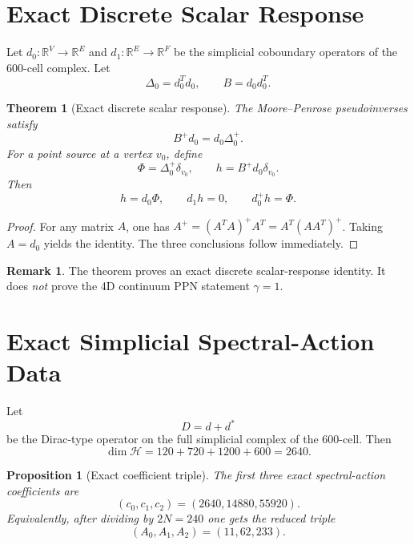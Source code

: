 \documentclass[12pt,a4paper]{article}
\newtheorem{theorem}{Theorem}
\newtheorem{proposition}{Proposition}
\theoremstyle{definition}
\newtheorem{remark}{Remark}
\begin{document}
\section{Exact Discrete Scalar Response}

Let $d_0:\mathbb{R}^V\to \mathbb{R}^E$ and $d_1:\mathbb{R}^E\to \mathbb{R}^F$ be the simplicial coboundary operators of the 600-cell complex.  Let
\begin{equation}
\Delta_0=d_0^T d_0,
\qquad
B=d_0 d_0^T.
\end{equation}

\begin{theorem}[Exact discrete scalar response]
\label{thm:scalar_response_exact}
The Moore--Penrose pseudoinverses satisfy
\begin{equation}
B^+ d_0 = d_0 \Delta_0^+.
\end{equation}
For a point source at a vertex $v_0$, define
\begin{equation}
\Phi=\Delta_0^+\delta_{v_0},
\qquad
h=B^+d_0\delta_{v_0}.
\end{equation}
Then
\begin{equation}
h=d_0\Phi,\qquad d_1 h=0,\qquad d_0^+h=\Phi.
\end{equation}
\end{theorem}

\begin{proof}
For any matrix $A$, one has $A^+=(A^T A)^+A^T=A^T(AA^T)^+$.  Taking $A=d_0$ yields the identity.  The three conclusions follow immediately.
\end{proof}

\begin{remark}
The theorem proves an exact discrete scalar-response identity.  It does \emph{not} prove the 4D continuum PPN statement $\gamma=1$.
\end{remark}

\section{Exact Simplicial Spectral-Action Data}

Let
\begin{equation}
D=d+d^*
\end{equation}
be the Dirac-type operator on the full simplicial complex of the 600-cell.  Then
\[
\dim\mathcal{H}=120+720+1200+600=2640.
\]

\begin{proposition}[Exact coefficient triple]
\label{prop:coeffs_exact}
The first three exact spectral-action coefficients are
\begin{equation}
(c_0,c_1,c_2)=(2640,14880,55920).
\end{equation}
Equivalently, after dividing by $2N=240$ one gets the reduced triple
\begin{equation}
(A_0,A_1,A_2)=(11,62,233).
\end{equation}
\end{proposition}
\end{document}

